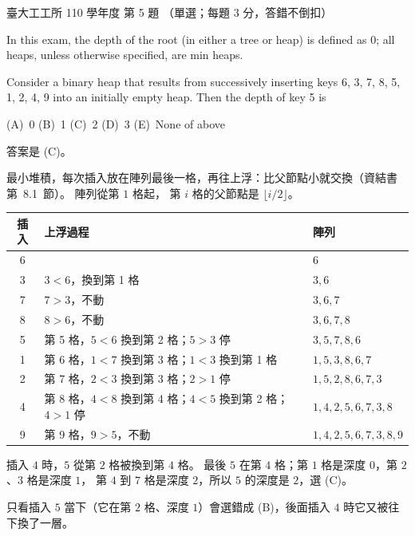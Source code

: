 \begin{pastexam}[label={px:ntu-110-ie-ds-05}]{臺大工工所 110 學年度 第 5 題}
（單選；每題 3 分，答錯不倒扣）

In this exam, the depth of the root (in either a tree or heap) is defined as 0; all heaps, unless
otherwise specified, are min heaps.

Consider a binary heap that results from successively inserting keys 6, 3, 7, 8, 5, 1, 2, 4, 9 into an
initially empty heap. Then the depth of key 5 is

(A)~0 \qquad (B)~1 \qquad (C)~2 \qquad (D)~3 \qquad (E)~None of above
\end{pastexam}

\begin{pastsoln}
答案是 (C)。

最小堆積，每次插入放在陣列最後一格，再往上浮：比父節點小就交換（資結書第~8.1~節）。 陣列從第 $1$ 格起，
第 $i$ 格的父節點是 $\lfloor i/2 \rfloor$。
\begin{center}
\begin{tabular}{cll}
\toprule
插入 & 上浮過程 & 陣列 \\
\midrule
6 & & $6$ \\
3 & $3 < 6$，換到第 1 格 & $3, 6$ \\
7 & $7 > 3$，不動 & $3, 6, 7$ \\
8 & $8 > 6$，不動 & $3, 6, 7, 8$ \\
5 & 第 5 格，$5 < 6$ 換到第 2 格；$5 > 3$ 停 & $3, 5, 7, 8, 6$ \\
1 & 第 6 格，$1 < 7$ 換到第 3 格；$1 < 3$ 換到第 1 格 & $1, 5, 3, 8, 6, 7$ \\
2 & 第 7 格，$2 < 3$ 換到第 3 格；$2 > 1$ 停 & $1, 5, 2, 8, 6, 7, 3$ \\
4 & 第 8 格，$4 < 8$ 換到第 4 格；$4 < 5$ 換到第 2 格；$4 > 1$ 停 & $1, 4, 2, 5, 6, 7, 3, 8$ \\
9 & 第 9 格，$9 > 5$，不動 & $1, 4, 2, 5, 6, 7, 3, 8, 9$ \\
\bottomrule
\end{tabular}
\end{center}
插入 $4$ 時，$5$ 從第 $2$ 格被換到第 $4$ 格。 最後 $5$ 在第 $4$ 格；第 $1$ 格是深度 $0$，第 $2$、$3$ 格是深度 $1$，
第 $4$ 到 $7$ 格是深度 $2$，所以 $5$ 的深度是 $2$，選 (C)。

只看插入 $5$ 當下（它在第 $2$ 格、深度 $1$）會選錯成 (B)，後面插入 $4$ 時它又被往下換了一層。
\end{pastsoln}
